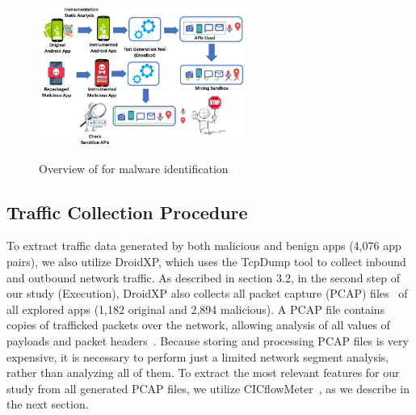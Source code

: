 \begin{figure}[h]
  \centering
  
    \includegraphics[width=0.60\textwidth]{image/mineSandbox.png} \\[\abovecaptionskip]
    
  \caption{Overview of \mas for malware identification}\label{fig:mine}
\end{figure}


\subsection{Traffic Collection Procedure}\label{sec:traffic}


To extract traffic data generated by both malicious and benign apps (4,076 app pairs), we also utilize DroidXP, which uses the TcpDump tool to collect inbound and outbound network traffic. As described in section 3.2, in the second step of our study (Execution), DroidXP also collects all packet capture (PCAP) files~\cite{DBLP:conf/iv/UhlarHR21} of all explored apps (1,182 original and 2,894 malicious). A PCAP file contains copies of trafficked packets over the network, allowing analysis of all values of payloads and packet headers~\cite{DBLP:conf/iv/UhlarHR21}. Because storing and processing PCAP files is very expensive, it is necessary to perform just a limited network segment analysis, rather than analyzing all of them. To extract the most relevant features for our study from all generated PCAP files, we utilize CICflowMeter~\cite{DBLP:conf/icissp/LashkariDMG17}, as we describe in the next section.

